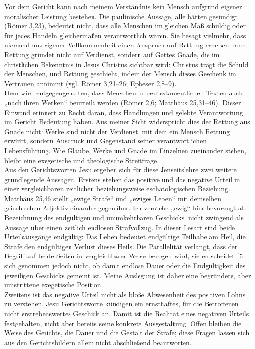 Vor dem Gericht kann nach meinem Verständnis kein Mensch aufgrund eigener moralischer Leistung bestehen. Die paulinische Aussage, alle hätten gesündigt (Römer 3,23), bedeutet nicht, dass alle Menschen im gleichen Maß schuldig oder für jedes Handeln gleichermaßen verantwortlich wären. Sie besagt vielmehr, dass niemand aus eigener Vollkommenheit einen Anspruch auf Rettung erheben kann. Rettung gründet nicht auf Verdienst, sondern auf Gottes Gnade, die im christlichen Bekenntnis in Jesus Christus sichtbar wird: Christus trägt die Schuld der Menschen, und Rettung geschieht, indem der Mensch dieses Geschenk im Vertrauen annimmt (vgl. Römer 3,21--26; Epheser 2,8--9).
\\

Dem wird entgegengehalten, dass Menschen in neutestamentlichen Texten auch „nach ihren Werken“ beurteilt werden (Römer 2,6; Matthäus 25,31--46). Dieser Einwand erinnert zu Recht daran, dass Handlungen und gelebte Verantwortung im Gericht Bedeutung haben. Aus meiner Sicht widerspricht dies der Rettung aus Gnade nicht: Werke sind nicht der Verdienst, mit dem ein Mensch Rettung erwirbt, sondern Ausdruck und Gegenstand seiner verantwortlichen Lebensführung. Wie Glaube, Werke und Gnade im Einzelnen zueinander stehen, bleibt eine exegetische und theologische Streitfrage.
\\

Aus den Gerichtsworten Jesu ergeben sich für diese Jenseitslehre zwei weitere grundlegende Aussagen. Erstens stehen das positive und das negative Urteil in einer vergleichbaren zeitlichen beziehungsweise eschatologischen Beziehung. Matthäus 25,46 stellt „ewige Strafe“ und „ewiges Leben“ mit demselben griechischen Adjektiv einander gegenüber. Ich verstehe „ewig“ hier bevorzugt als Bezeichnung des endgültigen und unumkehrbaren Geschicks, nicht zwingend als Aussage über einen zeitlich endlosen Strafvollzug. In dieser Lesart sind beide Urteilsausgänge endgültig: Das Leben bedeutet endgültige Teilhabe am Heil, die Strafe den endgültigen Verlust dieses Heils. Die Parallelität verlangt, dass der Begriff auf beide Seiten in vergleichbarer Weise bezogen wird; sie entscheidet für sich genommen jedoch nicht, ob damit endlose Dauer oder die Endgültigkeit des jeweiligen Geschicks gemeint ist. Meine Auslegung ist daher eine begründete, aber umstrittene exegetische Position.
\\

Zweitens ist das negative Urteil nicht als bloße Abwesenheit des positiven Lohns zu verstehen. Jesu Gerichtsworte kündigen ein ernsthaftes, für die Betroffenen nicht erstrebenswertes Geschick an. Damit ist die Realität eines negativen Urteils festgehalten, nicht aber bereits seine konkrete Ausgestaltung. Offen bleiben die Weise des Gerichts, die Dauer und die Gestalt der Strafe; diese Fragen lassen sich aus den Gerichtsbildern allein nicht abschließend beantworten.

